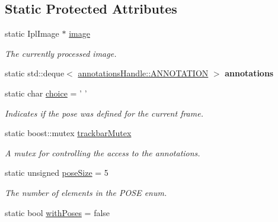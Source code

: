 \subsection*{Static Protected Attributes}
\begin{DoxyCompactItemize}
\item 
static IplImage $\ast$ \hyperlink{classannotationsHandle_a42cb5f5737262947250c709931232c69}{image}
\begin{DoxyCompactList}\small\item\em The currently processed image. \item\end{DoxyCompactList}\item 
\hypertarget{classannotationsHandle_ab2f2cde7baa5f716d5438d967b439535}{
static std::deque$<$ \hyperlink{structannotationsHandle_1_1ANNOTATION}{annotationsHandle::ANNOTATION} $>$ {\bfseries annotations}}
\label{classannotationsHandle_ab2f2cde7baa5f716d5438d967b439535}

\item 
\hypertarget{classannotationsHandle_afd05e88e13762e173d9d20fe3596216f}{
static char \hyperlink{classannotationsHandle_afd05e88e13762e173d9d20fe3596216f}{choice} = ' '}
\label{classannotationsHandle_afd05e88e13762e173d9d20fe3596216f}

\begin{DoxyCompactList}\small\item\em Indicates if the pose was defined for the current frame. \item\end{DoxyCompactList}\item 
\hypertarget{classannotationsHandle_a13d528766773c38917d47141e6b36252}{
static boost::mutex \hyperlink{classannotationsHandle_a13d528766773c38917d47141e6b36252}{trackbarMutex}}
\label{classannotationsHandle_a13d528766773c38917d47141e6b36252}

\begin{DoxyCompactList}\small\item\em A mutex for controlling the access to the annotations. \item\end{DoxyCompactList}\item 
\hypertarget{classannotationsHandle_a6cf1193bbaae6ca4f54c9c235c856e3f}{
static unsigned \hyperlink{classannotationsHandle_a6cf1193bbaae6ca4f54c9c235c856e3f}{poseSize} = 5}
\label{classannotationsHandle_a6cf1193bbaae6ca4f54c9c235c856e3f}

\begin{DoxyCompactList}\small\item\em The number of elements in the POSE enum. \item\end{DoxyCompactList}\item 
\hypertarget{classannotationsHandle_a1b62c46f79413ad8bea605806d626ebc}{
static bool \hyperlink{classannotationsHandle_a1b62c46f79413ad8bea605806d626ebc}{withPoses} = false}
\label{classannotationsHandle_a1b62c46f79413ad8bea605806d626ebc}


\end{DoxyCompactItemize}
